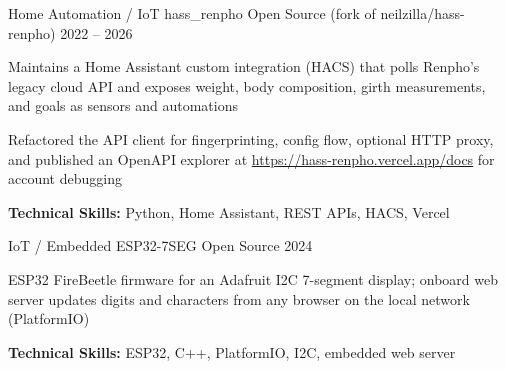 \begin{cventries}
\cventry
    {Home Automation / IoT} %
    {hass\_renpho} %
    {Open Source (fork of neilzilla/hass-renpho)} %
    {2022 -- 2026} %
    {
    \begin{cvitems} %
    \item {Maintains a Home Assistant custom integration (HACS) that polls Renpho's legacy cloud API and exposes weight, body composition, girth measurements, and goals as sensors and automations}
    \item {Refactored the API client for fingerprinting, config flow, optional HTTP proxy, and published an OpenAPI explorer at \url{https://hass-renpho.vercel.app/docs} for account debugging}
    \item {\textbf{Technical Skills:} Python, Home Assistant, REST APIs, HACS, Vercel}
    \end{cvitems}
    }

\cventry
    {IoT / Embedded} %
    {ESP32-7SEG} %
    {Open Source} %
    {2024} %
    {
    \begin{cvitems} %
    \item {ESP32 FireBeetle firmware for an Adafruit I2C 7-segment display; onboard web server updates digits and characters from any browser on the local network (PlatformIO)}
    \item {\textbf{Technical Skills:} ESP32, C++, PlatformIO, I2C, embedded web server}
    \end{cvitems}
    }

\end{cventries}
